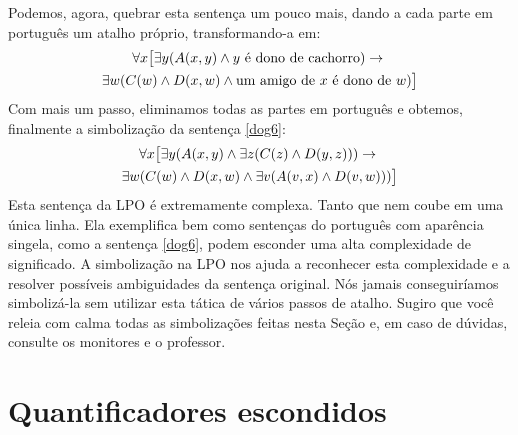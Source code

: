 \normalsize
\noindent Podemos, agora, quebrar esta sentença um pouco mais, dando a cada parte em português um atalho próprio, transformando-a em:
\begin{multline*}
	\forall x\bigl[\exists y(\mathord{A}(x,y) \wedge y\text{ é dono de cachorro})\rightarrow {}\\
\exists w(\mathord{C}(w) \wedge \mathord{D}(x,w) \wedge \text{um amigo de  $x$ é dono de }w)\bigr]
\end{multline*}
Com mais um passo, eliminamos todas as partes em português e obtemos, finalmente a simbolização da sentença \ref{dog6}: 
\begin{multline*}
\forall x\bigl[\exists y(\mathord{A}(x,y) \wedge \exists z(\mathord{C}(z) \wedge \mathord{D}(y,z))) \rightarrow {}\\
\exists w(\mathord{C}(w) \wedge \mathord{D}(x,w) \wedge \exists v(\mathord{A}(v,x) \wedge \mathord{D}(v,w)))\bigr]
\end{multline*}
Esta sentença da LPO é extremamente complexa.
Tanto que nem coube em uma única linha.
Ela exemplifica bem como sentenças do português com aparência singela, como a sentença \ref{dog6}, podem esconder uma alta complexidade de significado.
A simbolização na LPO nos ajuda a reconhecer esta complexidade e a resolver possíveis ambiguidades da sentença original.
Nós jamais conseguiríamos simbolizá-la sem utilizar esta tática de vários passos de atalho.
Sugiro que você releia com calma todas as simbolizações feitas nesta Seção e, em caso de dúvidas, consulte os monitores e o professor.


\section{Quantificadores escondidos}

